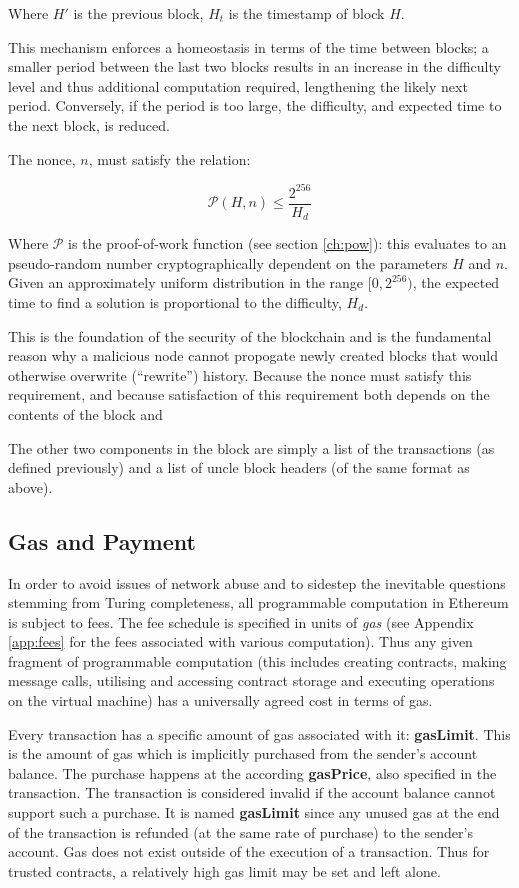 \documentclass[9pt,oneside]{amsart}
\begin{document}
\begin{multicols}{2}
Where $H'$ is the previous block, $H_t$ is the timestamp of block $H$.

This mechanism enforces a homeostasis in terms of the time between blocks; a smaller period between the last two blocks results in an increase in the difficulty level and thus additional computation required, lengthening the likely next period. Conversely, if the period is too large, the difficulty, and expected time to the next block, is reduced.

The nonce, $n$, must satisfy the relation:

\begin{equation}
\mathcal{P}(H, n) \leqslant \frac{2^{256}}{H_d}
\end{equation}

Where $\mathcal{P}$ is the proof-of-work function (see section \ref{ch:pow}): this evaluates to an pseudo-random number cryptographically dependent on the parameters $H$ and $n$. Given an approximately uniform distribution in the range $[0, 2^{256})$, the expected time to find a solution is proportional to the difficulty, $H_d$.

This is the foundation of the security of the blockchain and is the fundamental reason why a malicious node cannot propogate newly created blocks that would otherwise overwrite (``rewrite'') history. Because the nonce must satisfy this requirement, and because satisfaction of this requirement both depends on the contents of the block and

The other two components in the block are simply a list of the transactions (as defined previously) and a list of uncle block headers (of the same format as above).

\subsection{Gas and Payment} \label{ch:payment}

In order to avoid issues of network abuse and to sidestep the inevitable questions stemming from Turing completeness, all programmable computation in Ethereum is subject to fees. The fee schedule is specified in units of \textit{gas} (see Appendix \ref{app:fees} for the fees associated with various computation). Thus any given fragment of programmable computation (this includes creating contracts, making message calls, utilising and accessing contract storage and executing operations on the virtual machine) has a universally agreed cost in terms of gas.

Every transaction has a specific amount of gas associated with it: \textbf{gasLimit}. This is the amount of gas which is implicitly purchased from the sender's account balance. The purchase happens at the according \textbf{gasPrice}, also specified in the transaction. The transaction is considered invalid if the account balance cannot support such a purchase. It is named \textbf{gasLimit} since any unused gas at the end of the transaction is refunded (at the same rate of purchase) to the sender's account. Gas does not exist outside of the execution of a transaction. Thus for trusted contracts, a relatively high gas limit may be set and left alone.


\end{multicols}
\end{document}
